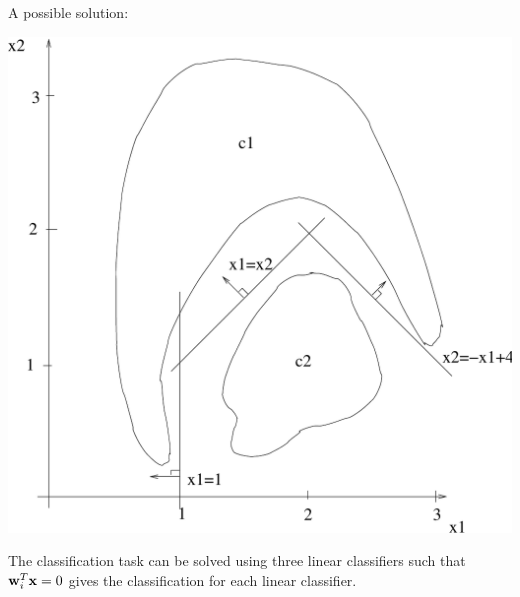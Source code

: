 \begin{enumerate}
\begin{solution}
    A possible solution:


    \begin{center}
      \includegraphics[scale=0.35]{e61}
    \end{center}

    The classification task can be solved using three linear classifiers
    such that ${\bf{w}}_i^T{\bf{x}}=0$ gives the classification for each
    linear classifier.


\end{solution}
\end{enumerate}
